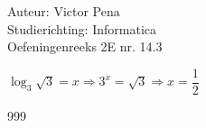 \documentclass[a4paper]{article}
\begin{document}
	
	\noindent \large Auteur: Victor Pena \\
	\noindent \large Studierichting: Informatica\\
	\noindent \large Oefeningenreeks 2E nr. 14.3\\
	

	
	\medskip
	
	\normalsize 
	
	$\log_3\sqrt{3} = x \Rightarrow 3^x = \sqrt{3} \Rightarrow x = \dfrac{1}{2}$\\
	
	
	\begin{thebibliography}{999}
	\end{thebibliography}
\end{document}
